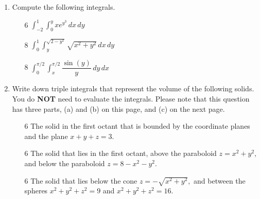 \documentclass[addpoints,12pt]{exam}
\begin{document}
\begin{enumerate}
\newpage
\item Compute the following integrals.
\begin{itemize}
\item[6] $\displaystyle\int_{-2}^1 \int_{0}^{y} xe^{y^3}\, dx \, dy $
\vfill
\item[8] $\displaystyle\int_0^1 \int_y^{\sqrt{2-y^2}} \sqrt{x^2+y^2} \, dx \, dy $
\vfill
\newpage
\item[8] $\displaystyle\int_0^{\pi/2}\int_{x}^{\pi/2} \dfrac{\sin(y)}{y}\, dy\, dx$
\vfill
\end{itemize}
\newpage
\item Write down triple integrals that represent the volume of the following solids. You do
\textbf{NOT} need to evaluate the integrals. Please note that this question has three parts, (a)
and (b) on this page, and (c) on the next page.
\begin{itemize}
\item[6] The solid in the first octant that is bounded by the coordinate planes and the plane
$x+y+z=3.$
\vfill
\item[6] The solid that lies in the first octant, above the paraboloid $z = x^2+y^2,$ and below the
paraboloid $z = 8-x^2-y^2.$
\vfill
\newpage
\item[6] The solid that lies below the cone $z = -\sqrt{x^2+y^2},$ and between the spheres
$x^2+y^2+z^2=9$ and $x^2+y^2+z^2=16.$\\
\vfill
\end{itemize}
\newpage
\end{enumerate}
\end{document}
